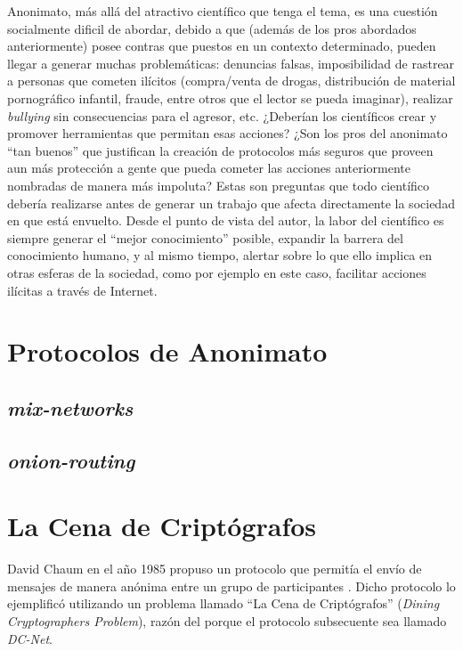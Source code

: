 Anonimato, más allá del atractivo científico que tenga el tema, es una cuestión socialmente dificil de abordar, debido a que (además de los pros abordados anteriormente) posee contras que puestos en un contexto determinado, pueden llegar a generar muchas problemáticas: denuncias falsas, imposibilidad de rastrear a personas que cometen ilícitos (compra/venta de drogas, distribución de material pornográfico infantil, fraude, entre otros que el lector se pueda imaginar), realizar \emph{bullying} sin consecuencias para el agresor, etc. ¿Deberían los científicos crear y promover herramientas que permitan esas acciones? ¿Son los pros del anonimato ``tan buenos'' que justifican la creación de protocolos más seguros que proveen aun más protección a gente que pueda cometer las acciones anteriormente nombradas de manera más impoluta? Estas son preguntas que todo científico debería realizarse antes de generar un trabajo que afecta directamente la sociedad en que está envuelto. Desde el punto de vista del autor, la labor del científico es siempre generar el ``mejor conocimiento'' posible, expandir la barrera del conocimiento humano, y al mismo tiempo, alertar sobre lo que ello implica en otras esferas de la sociedad, como por ejemplo en este caso, facilitar acciones ilícitas a través de Internet. 

\section{Protocolos de Anonimato}
\subsection{\emph{mix-networks}}
\subsection{\emph{onion-routing}}
\section{La Cena de Criptógrafos}

David Chaum en el año 1985 propuso un protocolo que permitía el envío de mensajes de manera anónima entre un grupo de participantes \cite{Chaum:1985:SWI:4372.4373, chaum1988dining}. Dicho protocolo lo ejemplificó utilizando un problema llamado ``La Cena de Criptógrafos'' (\emph{Dining Cryptographers Problem}), razón del porque el protocolo subsecuente sea llamado \emph{DC-Net}.

